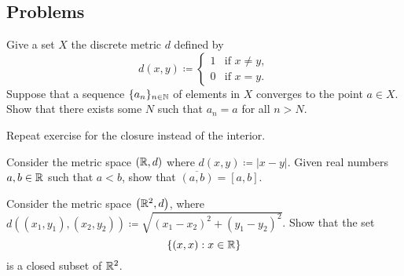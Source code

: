 \documentclass[../main.tex]{subfiles}
\begin{document}




\subsection{Problems}

\begin{homework}
    Give a set $X$ the discrete metric $d$ defined by
    \[d(x,y)\coloneqq\begin{cases}
        1 & \text{if }x\ne y, \\
        0 & \text{if }x=y.
    \end{cases}\]
    Suppose that a sequence $\{a_n\}_{n\in\mathbb N}$ of elements in $X$ converges to the point $a\in X$. Show that there exists some $N$ such that $a_n=a$ for all $n>N$.
\end{homework}

\begin{homework}
    Repeat exercise  for the closure instead of the interior.
\end{homework}

\begin{homework}
    Consider the metric space $(\mathbb R,d)$ where $d(x,y)\coloneqq|x-y|$. Given real numbers $a,b\in\mathbb R$ such that $a<b$, show that $\overline{(a,b)}=[a,b]$.
\end{homework}

\begin{homework} \label{prop:line-is-closed}
    Consider the metric space $\left(\mathbb R^2,d\right)$, where $d((x_1,y_1),(x_2,y_2))\coloneqq\sqrt{(x_1-x_2)^2+(y_1-y_2)^2}$. Show that the set
    \[\left\{(x,x):x\in\mathbb R\right\}\]
    is a closed subset of $\mathbb R^2$.
\end{homework}

\end{document}
